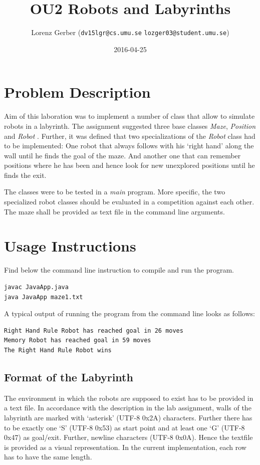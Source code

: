 \documentclass[a4paper,11pt,twoside]{article}
\title{OU2 Robots and Labyrinths}
\author{Lorenz Gerber ({\tt{dv15lgr@cs.umu.se}} {\tt{lozger03@student.umu.se}})}
\date{2016-04-25}
\begin{document}
\lstset{language=C}
\maketitle
\thispagestyle{empty}
\newpage
\tableofcontents
\thispagestyle{empty}
\newpage

\clearpage
{}

\section{Problem Description} 
Aim of this laboration was to implement a number of class that allow
to simulate robots in a labyrinth. The assignment suggested three base
classes \textit{Maze}, \textit{Position} and \textit{Robot}
\cite{maze}. Further, it was defined that two specializations of the
\textit{Robot} class had to be implemented: One robot that always
follows with his `right hand' along the wall until he finds the
goal of the maze. And another one that can remember positions where he has
been and hence look for new unexplored positions until he finds the exit.

The classes were to be tested in a \textit{main} program. More
specific, the two specialized robot classes should be evaluated in a
competition against each other. The maze shall be provided as text
file in the command line arguments. 

\section{Usage Instructions}
Find below the command line instruction to compile and run the
program. 
\begin{verbatim}
javac JavaApp.java
java JavaApp maze1.txt
\end{verbatim}

A typical output of running the program from the command line looks as
follows:
\begin{verbatim}
Right Hand Rule Robot has reached goal in 26 moves
Memory Robot has reached goal in 59 moves
The Right Hand Rule Robot wins
\end{verbatim}

\subsection{Format of the Labyrinth}
The environment in which the robots are supposed to exist has to be
provided in a text file. In accordance with the description in the lab
assignment, walls of the labyrinth are marked with `asterisk' (UTF-8 0x2A)
characters. Further there has to be exactly one `S' (UTF-8 0x53) as
start point and at least one `G' (UTF-8 0x47) as goal/exit. Further,
newline characters (UTF-8 0x0A). Hence the textfile is provided as a
visual representation. In the current implementation, each row has to
have the same length. 
\end{document}
